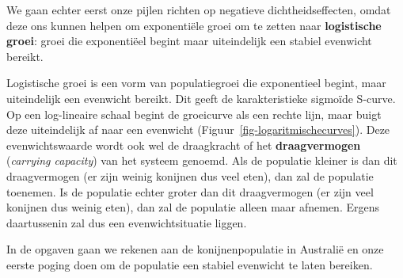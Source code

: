 \documentclass[
  a4paper,
]{scrbook}
\theoremstyle{definition}
\theoremstyle{remark}
\begin{document}
We gaan echter eerst onze pijlen richten op negatieve
dichtheidseffecten, omdat deze ons kunnen helpen om exponentiële groei
om te zetten naar \textbf{logistische groei}: groei die exponentiëel
begint maar uiteindelijk een stabiel evenwicht bereikt.

\begin{tcolorbox}[enhanced jigsaw, coltitle=black, breakable, bottomtitle=1mm, opacityback=0, colback=white, rightrule=.15mm, title=\textcolor{quarto-callout-note-color}{\faInfo}\hspace{0.5em}{Logaritmische groei}, bottomrule=.15mm, toprule=.15mm, left=2mm, colframe=quarto-callout-note-color-frame, toptitle=1mm, opacitybacktitle=0.6, titlerule=0mm, colbacktitle=quarto-callout-note-color!10!white, leftrule=.75mm, arc=.35mm]

Logistische groei is een vorm van populatiegroei die exponentieel
begint, maar uiteindelijk een evenwicht bereikt. Dit geeft de
karakteristieke sigmoïde S-curve. Op een log-lineaire schaal begint de
groeicurve als een rechte lijn, maar buigt deze uiteindelijk af naar een
evenwicht (Figuur~\ref{fig-logaritmischecurves}). Deze evenwichtswaarde
wordt ook wel de draagkracht of het \textbf{draagvermogen}
(\emph{carrying capacity}) van het systeem genoemd. Als de populatie
kleiner is dan dit draagvermogen (er zijn weinig konijnen dus veel
eten), dan zal de populatie toenemen. Is de populatie echter groter dan
dit draagvermogen (er zijn veel konijnen dus weinig eten), dan zal de
populatie alleen maar afnemen. Ergens daartussenin zal dus een
evenwichtsituatie liggen.

In de opgaven gaan we rekenen aan de konijnenpopulatie in Australië en
onze eerste poging doen om de populatie een stabiel evenwicht te laten
bereiken.

\begin{figure}[H]

{\centering 

}
\end{figure}
\end{tcolorbox}
\end{document}
